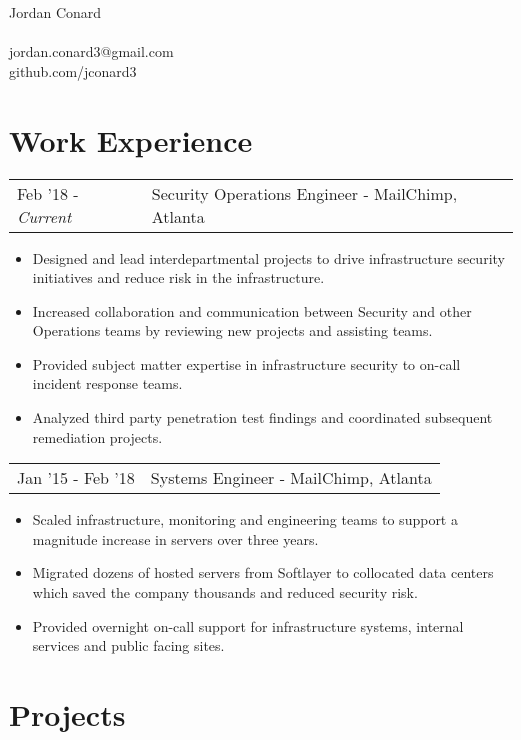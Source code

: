 \documentclass[letterpaper]{article}
\begin{document}
\pagestyle{empty} %


\begin{center}
    {\Huge Jordan Conard}\\~\\
    jordan.conard3@gmail.com\\
    github.com/jconard3
\end{center}

\section*{Work Experience}
\begin{tabular}{l|l}
{Feb '18 - \emph{Current}} & Security Operations Engineer - MailChimp, Atlanta
\end{tabular}
\begin{itemize}[noitemsep]
	\item Designed and lead interdepartmental projects to drive infrastructure security initiatives and reduce risk in the infrastructure.
	\item Increased collaboration and communication between Security and other Operations teams by reviewing new projects and assisting teams.
	\item Provided subject matter expertise in infrastructure security to on-call incident response teams.
	\item Analyzed third party penetration test findings and coordinated subsequent remediation projects.
\end{itemize}
\begin{tabular}{l|l}
{Jan '15 - Feb '18} & Systems Engineer - MailChimp, Atlanta\\
\end{tabular}
\begin{itemize}[noitemsep]
	\item Scaled infrastructure, monitoring and engineering teams to support a magnitude increase in servers over three years.
	\item Migrated dozens of hosted servers from Softlayer to collocated data centers which saved the company thousands and reduced security risk.
	\item Provided overnight on-call support for infrastructure systems, internal services and public facing sites.
\end{itemize}

\section*{Projects}
\end{document}
